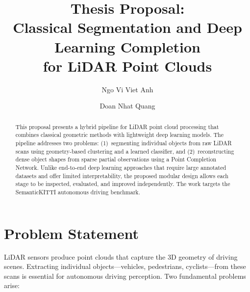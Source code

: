 \documentclass[runningheads]{llncs}
\begin{document}
\title{Thesis Proposal:\\Classical Segmentation and Deep Learning Completion\\for LiDAR Point Clouds}


\author{Ngo Vi Viet Anh \and
Doan Nhat Quang}



\maketitle

\begin{abstract}
This proposal presents a hybrid pipeline for LiDAR point cloud processing that combines classical geometric methods with lightweight deep learning models. The pipeline addresses two problems: (1)~segmenting individual objects from raw LiDAR scans using geometry-based clustering and a learned classifier, and (2)~reconstructing dense object shapes from sparse partial observations using a Point Completion Network. Unlike end-to-end deep learning approaches that require large annotated datasets and offer limited interpretability, the proposed modular design allows each stage to be inspected, evaluated, and improved independently. The work targets the SemanticKITTI autonomous driving benchmark.

\end{abstract}


\section{Problem Statement}

LiDAR sensors produce point clouds that capture the 3D geometry of driving scenes. Extracting individual objects---vehicles, pedestrians, cyclists---from these scans is essential for autonomous driving perception. Two fundamental problems arise:
\end{document}

